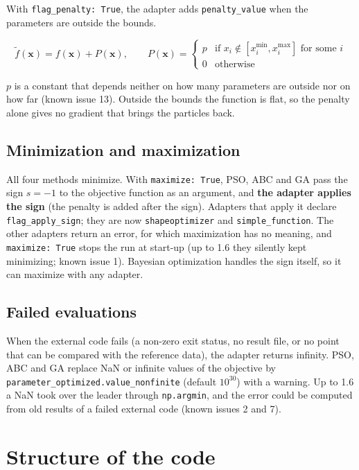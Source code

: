 \documentclass[11pt,a4paper]{article}
\begin{document}
With \texttt{flag\_penalty: True}, the adapter adds \texttt{penalty\_value} when the parameters are outside the bounds.

\begin{equation}
  \tilde f(\mathbf{x}) = f(\mathbf{x}) + P(\mathbf{x}),\qquad
  P(\mathbf{x}) =
  \begin{cases}
    p & \text{if } x_i \notin [x_i^{\min}, x_i^{\max}] \text{ for some } i\\
    0 & \text{otherwise}
  \end{cases}
\end{equation}

$p$ is a constant that depends neither on how many parameters are outside nor on how far (known issue 13). Outside the bounds the function is flat, so the penalty alone gives no gradient that brings the particles back.

\subsection{Minimization and maximization}

All four methods minimize. With \texttt{maximize: True}, PSO, ABC and GA pass the sign $s = -1$ to the objective function as an argument, and \textbf{the adapter applies the sign} (the penalty is added after the sign). Adapters that apply it declare \texttt{flag\_apply\_sign}; they are now \texttt{shapeoptimizer} and \texttt{simple\_function}. The other adapters return an error, for which maximization has no meaning, and \texttt{maximize: True} stops the run at start-up (up to 1.6 they silently kept minimizing; known issue 1). Bayesian optimization handles the sign itself, so it can maximize with any adapter.

\subsection{Failed evaluations}

When the external code fails (a non-zero exit status, no result file, or no point that can be compared with the reference data), the adapter returns infinity. PSO, ABC and GA replace NaN or infinite values of the objective by \texttt{parameter\_optimized.value\_nonfinite} (default $10^{30}$) with a warning. Up to 1.6 a NaN took over the leader through \texttt{np.argmin}, and the error could be computed from old results of a failed external code (known issues 2 and 7).

\section{Structure of the code}\label{sec:structure}
\end{document}
